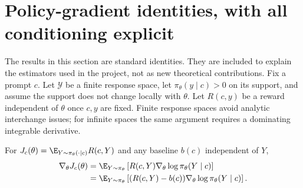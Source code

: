 \section{Policy-gradient identities, with all conditioning explicit}
\label{app:policy_proofs}
The results in this section are standard identities. They are included to explain the estimators used in the project, not as new theoretical contributions. Fix a prompt $c$. Let $\mathcal Y$ be a finite response space, let $\pi_\theta(y\mid c)>0$ on its support, and assume the support does not change locally with $\theta$. Let $R(c,y)$ be a reward independent of $\theta$ once $c,y$ are fixed. Finite response spaces avoid analytic interchange issues; for infinite spaces the same argument requires a dominating integrable derivative.

\begin{proposition}
For $J_c(\theta)=\E_{Y\sim\pi_\theta(\cdot\mid c)}R(c,Y)$ and any baseline $b(c)$ independent of $Y$,
\begin{align}
\nabla_\theta J_c(\theta)
&=\E_{Y\sim\pi_\theta}\left[R(c,Y)\nabla_\theta\log\pi_\theta(Y\mid c)\right]\\
&=\E_{Y\sim\pi_\theta}\left[(R(c,Y)-b(c))\nabla_\theta\log\pi_\theta(Y\mid c)\right].
\end{align}
\end{proposition}
